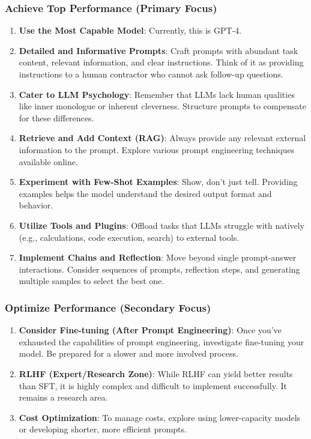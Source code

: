 \subsubsection{Achieve Top Performance (Primary Focus)}
\begin{enumerate}
    \item \textbf{Use the Most Capable Model}: Currently, this is GPT-4.
    \item \textbf{Detailed and Informative Prompts}: Craft prompts with abundant task content, relevant information, and clear instructions. Think of it as providing instructions to a human contractor who cannot ask follow-up questions.
    \item \textbf{Cater to LLM Psychology}: Remember that LLMs lack human qualities like inner monologue or inherent cleverness. Structure prompts to compensate for these differences.
    \item \textbf{Retrieve and Add Context (RAG)}: Always provide any relevant external information to the prompt. Explore various prompt engineering techniques available online.
    \item \textbf{Experiment with Few-Shot Examples}: Show, don't just tell. Providing examples helps the model understand the desired output format and behavior.
    \item \textbf{Utilize Tools and Plugins}: Offload tasks that LLMs struggle with natively (e.g., calculations, code execution, search) to external tools.
    \item \textbf{Implement Chains and Reflection}: Move beyond single prompt-answer interactions. Consider sequences of prompts, reflection steps, and generating multiple samples to select the best one.
\end{enumerate}

\subsubsection{Optimize Performance (Secondary Focus)}
\begin{enumerate}
    \item \textbf{Consider Fine-tuning (After Prompt Engineering)}: Once you've exhausted the capabilities of prompt engineering, investigate fine-tuning your model. Be prepared for a slower and more involved process.
    \item \textbf{RLHF (Expert/Research Zone)}: While RLHF can yield better results than SFT, it is highly complex and difficult to implement successfully. It remains a research area.
    \item \textbf{Cost Optimization}: To manage costs, explore using lower-capacity models or developing shorter, more efficient prompts.
\end{enumerate}

